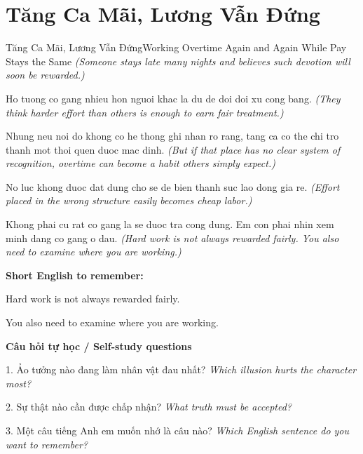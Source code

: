 \section{Tăng Ca Mãi, Lương Vẫn Đứng}
\begin{truyen}{Tăng Ca Mãi, Lương Vẫn Đứng}{Working Overtime Again and Again While Pay Stays the Same}
\textit{(Someone stays late many nights and believes such devotion will soon be rewarded.)}

Ho tuong co gang nhieu hon nguoi khac la du de doi doi xu cong bang.
\textit{(They think harder effort than others is enough to earn fair treatment.)}

Nhung neu noi do khong co he thong ghi nhan ro rang, tang ca co the chi tro thanh mot thoi quen duoc mac dinh.
\textit{(But if that place has no clear system of recognition, overtime can become a habit others simply expect.)}

No luc khong duoc dat dung cho se de bien thanh suc lao dong gia re.
\textit{(Effort placed in the wrong structure easily becomes cheap labor.)}

\end{truyen}

\begin{baihoc}
Khong phai cu rat co gang la se duoc tra cong dung. Em con phai nhin xem minh dang co gang o dau.
\textit{(Hard work is not always rewarded fairly. You also need to examine where you are working.)}
\end{baihoc}

\begin{ghinhoanh}
\textbf{Short English to remember:}

Hard work is not always rewarded fairly.

You also need to examine where you are working.

\end{ghinhoanh}

\begin{tuhocnhanh}
\textbf{Câu hỏi tự học / Self-study questions}

1. Ảo tưởng nào đang làm nhân vật đau nhất? \textit{Which illusion hurts the character most?}

2. Sự thật nào cần được chấp nhận? \textit{What truth must be accepted?}

3. Một câu tiếng Anh em muốn nhớ là câu nào? \textit{Which English sentence do you want to remember?}
\end{tuhocnhanh}
\ngancach

